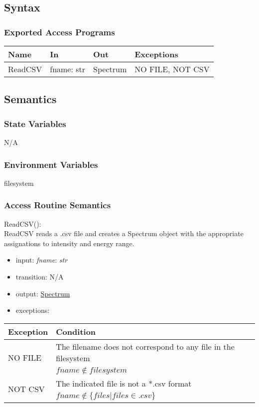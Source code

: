 \documentclass[12pt, titlepage]{article}
\begin{document}
\subsection{Syntax}

\subsubsection{Exported Access Programs}

\begin{center}
\begin{tabular}{p{2cm} p{4cm} p{4cm} p{5cm}}
\hline
\textbf{Name} & \textbf{In} & \textbf{Out} & \textbf{Exceptions} \\
\hline
ReadCSV & fname: str & Spectrum & NO FILE, NOT CSV\\
\hline
\end{tabular}
\end{center}

\subsection{Semantics}

\subsubsection{State Variables}
N/A

\subsubsection{Environment Variables}
filesystem

\subsubsection{Access Routine Semantics}

\noindent ReadCSV():\\
ReadCSV reads a .csv file and creates a Spectrum object with the appropriate assignations to intensity and energy range.
\begin{itemize}
	\item input: \textit{fname}: \textit{str}
	\item transition: N/A 
	\item output: \hyperref[Mod:Spectrum]{Spectrum}
	\item exceptions:
\end{itemize}
\begin{center}
	\begin{tabular}{p{3cm} p{12cm}}
		\toprule[0.15em]
		\textbf{Exception} & \textbf{Condition}\\
		\midrule[0.1em]
		\multirow{2}{0.25\textwidth}{NO FILE} & The filename does not correspond to any file in the filesystem\\ 
		& $fname \notin filesystem$\\ 
		\midrule[0.05em]
		\multirow{2}{0.25\textwidth}{NOT CSV} & The indicated file is not a *.csv format\\
		& $fname \notin \{files|files \in .csv\}$\\ 
		\bottomrule[0.15em]
	\end{tabular}
\end{center}
\end{document}
